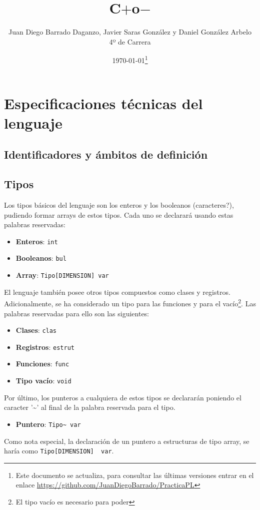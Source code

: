 \documentclass[10pt,a4paper]{article}
\title{\Huge C$+${\normalsize o}$-$}
\author{Juan Diego Barrado Daganzo, Javier Saras González y Daniel González Arbelo \\ 4º de Carrera}
\date{\today\footnote{Este documento se actualiza, para consultar las últimas versiones entrar en el enlace \url{https://github.com/JuanDiegoBarrado/PracticaPL}}}
\begin{document}
\maketitle

\section{Especificaciones técnicas del lenguaje}
\subsection{Identificadores y ámbitos de definición}

\subsection{Tipos}
Los tipos básicos del lenguaje son los enteros y los booleanos (caracteres?), pudiendo formar arrays de estos tipos. Cada uno se declarará usando estas palabras reservadas:
\begin{itemize}
    \item \textbf{Enteros}: \texttt{int}
    \item \textbf{Booleanos}: \texttt{bul}
    \item \textbf{Array}: \texttt{Tipo[DIMENSION] var}
\end{itemize}
El lenguaje también posee otros tipos compuestos como clases y registros. Adicionalmente, se ha considerado un tipo para las funciones y para el vacío\footnote{El tipo vacío es necesario para poder }. Las palabras reservadas para ello son las siguientes:
\begin{itemize}
    \item \textbf{Clases}: \texttt{clas}
    \item \textbf{Registros}: \texttt{estrut}
    \item \textbf{Funciones}: \texttt{func}
    \item \textbf{Tipo vacío}: \texttt{void}
\end{itemize}
Por último, los punteros a cualquiera de estos tipos se declararán poniendo el caracter '\~{}' al final de la palabra reservada para el tipo.
\begin{itemize}
    \item \textbf{Puntero}: \texttt{Tipo\~{} var}
\end{itemize}
Como nota especial, la declaración de un puntero a estructuras de tipo array, se haría como \texttt{Tipo[DIMENSION]~ var}.
\end{document}
